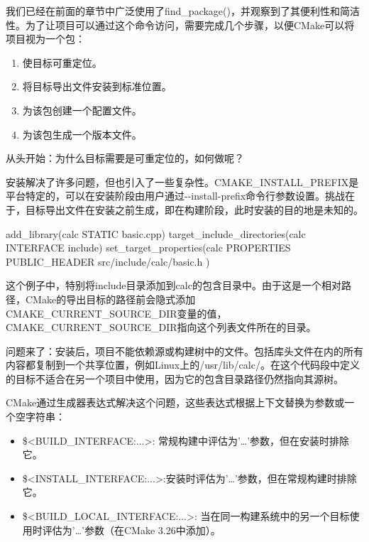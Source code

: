 
我们已经在前面的章节中广泛使用了find\_package()，并观察到了其便利性和简洁性。为了让项目可以通过这个命令访问，需要完成几个步骤，以便CMake可以将项目视为一个包：

\begin{enumerate}
\item
使目标可重定位。

\item
将目标导出文件安装到标准位置。

\item
为该包创建一个配置文件。

\item
为该包生成一个版本文件。
\end{enumerate}

从头开始：为什么目标需要是可重定位的，如何做呢？


安装解决了许多问题，但也引入了一些复杂性。CMAKE\_INSTALL\_PREFIX是平台特定的，可以在安装阶段由用户通过-{}-install-prefix命令行参数设置。挑战在于，目标导出文件在安装之前生成，即在构建阶段，此时安装的目的地是未知的。


\begin{cmake}
add_library(calc STATIC basic.cpp)
target_include_directories(calc INTERFACE include)
set_target_properties(calc PROPERTIES
    PUBLIC_HEADER src/include/calc/basic.h
)
\end{cmake}

这个例子中，特别将include目录添加到calc的包含目录中。由于这是一个相对路径，CMake的导出目标的路径前会隐式添加CMAKE\_CURRENT\_SOURCE\_DIR变量的值，CMAKE\_CURRENT\_SOURCE\_DIR指向这个列表文件所在的目录。

问题来了：安装后，项目不能依赖源或构建树中的文件。包括库头文件在内的所有内容都复制到一个共享位置，例如Linux上的/usr/lib/calc/。在这个代码段中定义的目标不适合在另一个项目中使用，因为它的包含目录路径仍然指向其源树。

CMake通过生成器表达式解决这个问题，这些表达式根据上下文替换为参数或一个空字符串：

\begin{itemize}
\item
\$<BUILD\_INTERFACE:...>: 常规构建中评估为'…'参数，但在安装时排除它。

\item
\$<INSTALL\_INTERFACE:...>:安装时评估为'…'参数，但在常规构建时排除它。

\item
\$<BUILD\_LOCAL\_INTERFACE:...>: 当在同一构建系统中的另一个目标使用时评估为'…'参数（在CMake 3.26中添加）。
\end{itemize}

